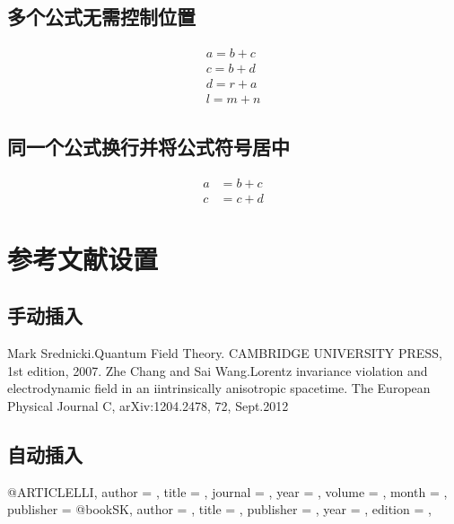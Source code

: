 \documentclass[11pt,onecolumn,a4paper]{ctexart}
\begin{document}
	\subsection{多个公式无需控制位置}
	\begin{gather}
		a=b+c\\
		c=b+d\\
		d=r+a\\
		l=m+n
	\end{gather}
	\subsection{同一个公式换行并将公式符号居中}
	\begin{equation}
		\begin{aligned}
			a&=b+c\\
			c&=c+d
		\end{aligned}
	\end{equation}


     \section{参考文献设置}
     \subsection{手动插入}
     \begin{thebibliography}{99}
     	Mark Srednicki.Quantum Field Theory.
     	CAMBRIDGE UNIVERSITY PRESS, 1st edition, 2007.
     	Zhe Chang and Sai Wang.Lorentz invariance violation
     	and electrodynamic field in an iintrinsically
     	anisotropic spacetime.
     	The European Physical Journal C,
     	arXiv:1204.2478, 72, Sept.2012
     \end{thebibliography}
 
     \subsection{自动插入}

     @ARTICLE{LLI,
     	author = {},
     	title = {},
     	journal = {},
     	year = {},
     	volume = {},
     	month = {},
     	publisher = {}
     }
    @book{SK,
    	author = {},
    	title = {},
    	publisher = {},
    	year = {},
    	edition = {},
    }
    
    
    \cite{SK}
    \nocite{LLI}
\end{document}
